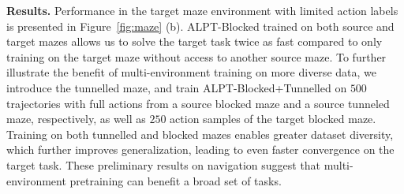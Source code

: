 \documentclass{article} %
\begin{document}

\textbf{Results.} Performance in the target maze environment with limited action labels is presented in Figure~\ref{fig:maze} (b). ALPT-Blocked trained on both source and target mazes allows us to solve the target task twice as fast compared to only training on the target maze without access to another source maze. To further illustrate the benefit of multi-environment training on more diverse data, we introduce the tunnelled maze, and train ALPT-Blocked+Tunnelled on $500$ trajectories with full actions from a source blocked maze and a source tunneled maze, respectively, as well as $250$ action samples of the target blocked maze. Training on both tunnelled and blocked mazes enables greater dataset diversity, which further improves  generalization, leading to even faster convergence on the target task. %
These preliminary results on navigation suggest that multi-environment pretraining can benefit a broad set of tasks.

\end{document}
